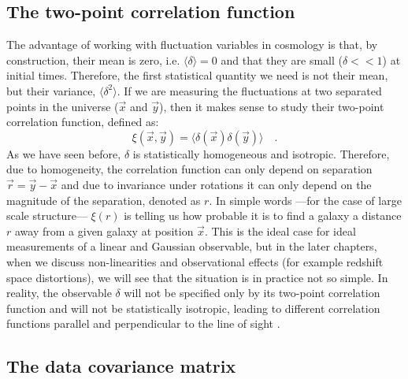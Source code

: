 \subsection{The two-point correlation function}

The advantage of working with fluctuation variables in cosmology is that, by construction, their mean is zero, i.e. $\langle \delta \rangle = 0$
and that they are small ($\delta<<1$) at initial times.
Therefore, the first statistical quantity we need is not their mean, but their variance, $\langle \delta^2 \rangle$. If 
we are measuring the fluctuations at two separated points in the universe ($\vec{x}$ and $\vec{y}$),
then it makes sense to study their two-point correlation function, defined as:
\begin{equation} \label{eq:correlationfunct}
\xi(\vec{x} ,\vec{y}) = \langle \delta (\vec{x})  \delta (\vec{y}) \rangle \quad.
\end{equation}
As we have seen before, $\delta$ is statistically homogeneous and isotropic. Therefore, due to homogeneity, the correlation
function can only depend on separation $\vec r = \vec{y} - \vec{x} $ and due to invariance under 
rotations it can only depend on the magnitude of the separation, denoted as $r$.
In simple words ---for the case of large scale structure--- $\xi(r)$ is telling us how probable it is to find
a galaxy a distance $r$ away from a given galaxy at position $\vec x$.
This is the ideal case for ideal measurements of a linear and Gaussian observable, but in the later chapters, when we discuss
non-linearities and observational effects (for example redshift space distortions), we will see that the situation is in practice not so simple. In reality, 
the observable $\delta$ will not be specified only by its 
two-point correlation function and will not be statistically isotropic, leading to different correlation
functions parallel and perpendicular to the line of sight \cite{(cite some BAO stuff)}.

\subsection{The data covariance matrix}


